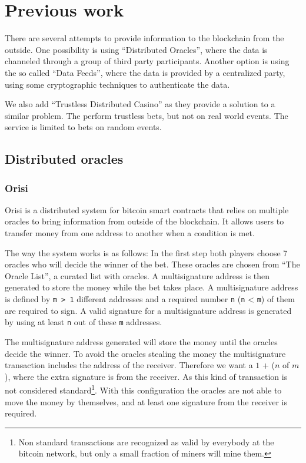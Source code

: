\section{Previous work} \label{sec:previous_work}

There are several attempts to provide information to the blockchain from the
  outside.
One possibility is using  ``Distributed Oracles'', where the data is channeled
  through a group of third party participants.
Another option is using the so called ``Data Feeds'', where the data is provided
  by a centralized party, using some cryptographic techniques to authenticate
  the data.

We also add ``Trustless Distributed Casino'' as they provide a solution to a
  similar problem.
The perform trustless bets, but not  on real world events.
The service is limited to bets on random events.

\subsection{Distributed oracles}
\subsubsection{Orisi}
Orisi \cite{orisiwhitepaper} is a distributed system for bitcoin smart
  contracts that relies on multiple oracles to bring information from outside
  of the blockchain.
It allows users to transfer money from one address to another when a condition
  is met.

The way the system works is as follows:
In the first step both players choose 7 oracles who will decide the winner of
  the bet.
These oracles are chosen from ``The Oracle List'', a curated list with oracles.
A multisignature address is then generated to store the money while the bet
  takes place.
A multisignature address is defined by \texttt{m > 1} different addresses and a
  required number \texttt{n} (\texttt{n} < \texttt{m}) of them are required to
  sign.
A valid signature for a multisignature address is generated by using at least
  \texttt{n} out of these \texttt{m} addresses.

The multisignature address generated will store the money until the oracles
  decide the winner.
To avoid the oracles stealing the money the multisignature transaction includes
  the address of the receiver.
Therefore we want a $1$ + ($n$ of $m$), where the extra signature is
  from the receiver.
As this kind of transaction is not considered
  standard\footnote{Non standard transactions are recognized as valid
  by everybody at the bitcoin network, but only a small fraction of
  miners will mine them.}.
 With this configuration the oracles are
  not able to move the money by themselves, and at least one signature
  from the receiver is required.

